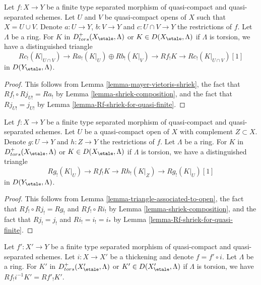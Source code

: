 \begin{lemma}
\label{lemma-relative-mayer-vietoris}
Let $f : X \to Y$ be a finite type separated morphism of quasi-compact and
quasi-separated schemes. Let $U$ and $V$ be quasi-compact opens of $X$
such that $X = U \cup V$. Denote $a : U \to Y$, $b : V \to Y$ and
$c : U \cap V \to Y$ the restrictions of $f$. Let $\Lambda$ be a ring.
For $K$ in $D^+_{tors}(X_\etale, \Lambda)$ or $K \in D(X_\etale, \Lambda)$
if $\Lambda$ is torsion, we have a distinguished triangle
$$
Rc_!(K|_{U \cap V}) \to
Ra_!(K|_U) \oplus Rb_!(K|_V) \to
Rf_!K \to 
Rc_!(K|_{U \cap V})[1]
$$
in $D(Y_\etale, \Lambda)$.
\end{lemma}

\begin{proof}
This follows from Lemma \ref{lemma-mayer-vietoris-shriek},
the fact that $Rf_! \circ Rj_{U!} = Ra_!$ by
Lemma \ref{lemma-shriek-composition}, and the fact that
$Rj_{U!} = j_{U!}$ by Lemma \ref{lemma-Rf-shriek-for-quasi-finite}.
\end{proof}

\begin{lemma}
\label{lemma-relative-triangle-associated-to-open}
Let $f : X \to Y$ be a finite type separated morphism of quasi-compact and
quasi-separated schemes. Let $U$ be a quasi-compact open of $X$ with
complement $Z \subset X$.  Denote $g : U \to Y$ and $h : Z \to Y$
the restrictions of $f$. Let $\Lambda$ be a ring.
For $K$ in $D^+_{tors}(X_\etale, \Lambda)$ or $K \in D(X_\etale, \Lambda)$
if $\Lambda$ is torsion, we have a distinguished triangle
$$
Rg_!(K|_U) \to
Rf_!K \to
Rh_!(K|_Z) \to
Rg_!(K|_U)[1]
$$
in $D(Y_\etale, \Lambda)$.
\end{lemma}

\begin{proof}
This follows from
Lemma \ref{lemma-triangle-associated-to-open},
the fact that $Rf_! \circ Rj_! = Rg_!$ and $Rf_! \circ Ri_!$ by
Lemma \ref{lemma-shriek-composition}, and the fact that
$Rj_! = j_!$ and $Ri_! = i_! = i_*$ by
Lemma \ref{lemma-Rf-shriek-for-quasi-finite}.
\end{proof}

\begin{lemma}
\label{lemma-shriek-and-thickening}
Let $f' : X' \to Y$ be a finite type separated morphism of quasi-compact and
quasi-separated schemes. Let $i : X \to X'$ be a thickening and
denote $f = f' \circ i$. Let $\Lambda$ be a ring.
For $K'$ in $D^+_{tors}(X'_\etale, \Lambda)$ or $K' \in D(X'_\etale, \Lambda)$
if $\Lambda$ is torsion, we have $Rf_!i^{-1}K' = Rf'_!K'$.
\end{lemma}

